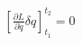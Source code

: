 \documentclass[preview]{standalone}
\begin{document}
\begin{align*}
\left[ \frac{\partial L}{\partial \dot{q}} \delta q \right]_{t_1}^{t_2} = 0
\end{align*}
\end{document}
